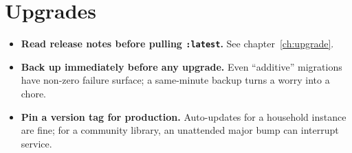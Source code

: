 \section{Upgrades}

\begin{itemize}
  \item \textbf{Read release notes before pulling \texttt{:latest}.}
        See chapter~\ref{ch:upgrade}.
  \item \textbf{Back up immediately before any upgrade.} Even
        ``additive'' migrations have non-zero failure surface;
        a same-minute backup turns a worry into a chore.
  \item \textbf{Pin a version tag for production.} Auto-updates
        for a household instance are fine; for a community library,
        an unattended major bump can interrupt service.
\end{itemize}
